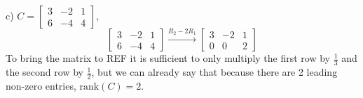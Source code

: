 

        
        
        




 \newpage



\begin{solution}
    c) $C=\begin{bmatrix}
3 & -2 & 1 \\
6 & -4 & 4
    \end{bmatrix}$,
    \[
    \begin{bmatrix}
3 & -2 & 1 \\
6 & -4 & 4
    \end{bmatrix}
\xrightarrow{R_2 -2 R_1}
    \begin{bmatrix}
3 & -2 & 1 \\
0 & 0 & 2
    \end{bmatrix}
    \]
To bring the matrix to REF it is sufficient to only multiply the first row by $\frac{1}{3}$ and the second row by $\frac{1}{2}$, but we can already say that because there are 2 leading non-zero entries, $\text{rank}(C)=2$.

    
\end{solution}
\bigskip

